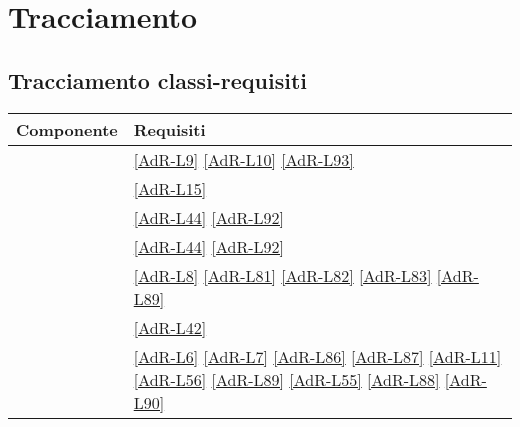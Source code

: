 \section{Tracciamento}
\subsection{Tracciamento classi-requisiti}
\begin{longtable}{|m{12cm}|>{\centering}m{2cm}|}
	\hline \textbf{Componente} & \textbf{Requisiti} \tabularnewline 
	\endfirsthead
	\hline \coderef{Framework::Model::API::LifeCycle::LifeCycle} & \ref{AdR-L9} \linebreak \ref{AdR-L10} \linebreak \ref{AdR-L93} \tabularnewline
	\hline \coderef{Framework::Model::API::Notification::WebNotification} & \ref{AdR-L15} \linebreak \tabularnewline
	\hline \coderef{Framework::Model::API::ExternalAPI::ExternalAPI} & \ref{AdR-L44} \linebreak \ref{AdR-L92} \tabularnewline
	\hline \coderef{Framework::Model::API::ExternalAPI::ExternalAPIStore} & \ref{AdR-L44} \linebreak \ref{AdR-L92} \tabularnewline
	\hline \coderef{Framework::Model::API::DBOperations::DBOperations} & \ref{AdR-L8} \linebreak \ref{AdR-L81} \linebreak \ref{AdR-L82} \linebreak \ref{AdR-L83} \linebreak \ref{AdR-L89} \tabularnewline
	\hline \coderef{Framework::Model::API::MatchRegularExpr::MatchRegularExpr} & \ref{AdR-L42} \tabularnewline
	\hline \coderef{Framework::Controller::GenericBubble} & \ref{AdR-L6} \linebreak \ref{AdR-L7} \linebreak \ref{AdR-L86} \linebreak \ref{AdR-L87} \linebreak \ref{AdR-L11} \linebreak \ref{AdR-L56} \linebreak \ref{AdR-L89} \linebreak \ref{AdR-L55} \linebreak \ref{AdR-L88} \linebreak \ref{AdR-L90} \tabularnewline

\end{longtable}
